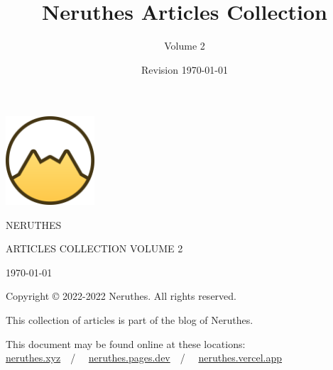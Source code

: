 \documentclass[12pt,a4paper]{report}
\title{Neruthes Articles Collection}
\author{Volume 2}
\date{Revision \today}
\begin{document}
\begin{titlepage}
	\center
	\ttfamily
	\leavevmode
	\vskip 90pt
	\includegraphics[width=33mm]{wwwsrc/neruthes-forceCircle-unpadded.png}\par
	\vskip 50pt
		{\fontsize{24pt}{24pt}\selectfont\MakeUppercase{NERUTHES}}\par\vskip 30pt
		{\normalsize\MakeUppercase{Articles Collection Volume 2}}\par
	\vfill
	\small
	\today\par
\end{titlepage}
\pagestyle{plain}
\tableofcontents\clearpage





\rmfamily








\clearpage\pagestyle{empty}
\leavevmode\vfill
\footnotesize\sffamily
Copyright \copyright{} 2022-2022 Neruthes. All rights reserved.\par
This collection of articles is part of the blog of Neruthes.\par
This document may be found online at these locations:\\
\href{https://neruthes.xyz/articles/Neruthes_articles_vol002.pdf}{neruthes.xyz}~~/~~%
\href{https://neruthes.pages.dev/articles/Neruthes_articles_vol002.pdf}{neruthes.pages.dev}~~/~~%
\href{https://neruthes.vercel.app/articles/Neruthes_articles_vol002.pdf}{neruthes.vercel.app}
\end{document}
